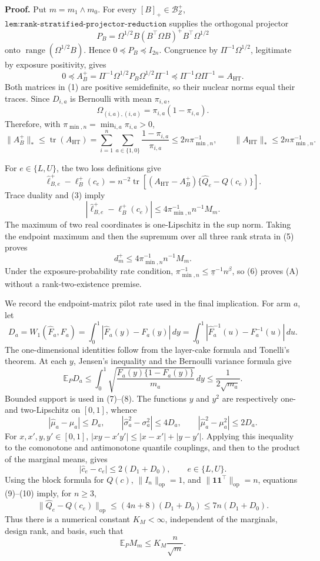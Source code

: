 \textbf{Proof.}
Put \(m=m_1\wedge m_0\).  For every \([B]_+\in\mathcal B_Z^+\), \(\texttt{lem:rank-stratified-projector-reduction}\) supplies the orthogonal projector
\[
P_B=\Omega^{1/2}B(B^{\top}\Omega B)^+B^{\top}\Omega^{1/2}
\]
onto \(\operatorname{range}(\Omega^{1/2}B)\).  Hence \(0\preceq P_B\preceq I_{2n}\).  Congruence by \(\Pi^{-1}\Omega^{1/2}\), legitimate by exposure positivity, gives
\[
0\preceq
A_B^+=\Pi^{-1}\Omega^{1/2}P_B\Omega^{1/2}\Pi^{-1}
\preceq
\Pi^{-1}\Omega\Pi^{-1}=A_{\mathrm{HT}}.
\tag{1}
\]
Both matrices in (1) are positive semidefinite, so their nuclear norms equal their traces.  Since \(D_{i,a}\) is Bernoulli with mean \(\pi_{i,a}\),
\[
\Omega_{(i,a),(i,a)}=\pi_{i,a}(1-\pi_{i,a}).
\tag{2}
\]
Therefore, with \(\pi_{\min,n}=\min_{i,a}\pi_{i,a}>0\),
\[
\lVert A_B^+\rVert_*
\le\operatorname{tr}(A_{\mathrm{HT}})
=\sum_{i=1}^n\sum_{a\in\{1,0\}}
\frac{1-\pi_{i,a}}{\pi_{i,a}}
\le2n\pi_{\min,n}^{-1},
\qquad
\lVert A_{\mathrm{HT}}\rVert_*
\le2n\pi_{\min,n}^{-1}.
\tag{3}
\]

For \(e\in\{L,U\}\), the two loss definitions give
\[
\widehat\ell_{B,e}^+-\ell_B^+(c_e)
=n^{-2}\operatorname{tr}\!\left[
(A_{\mathrm{HT}}-A_B^+)\{\widehat Q_e-Q(c_e)\}
\right].
\tag{4}
\]
Trace duality and (3) imply
\[
\left|\widehat\ell_{B,e}^+-\ell_B^+(c_e)\right|
\le4\pi_{\min,n}^{-1}n^{-1}M_m.
\tag{5}
\]
The maximum of two real coordinates is one-Lipschitz in the sup norm.  Taking the endpoint maximum and then the supremum over all three rank strata in (5) proves
\[
d_m^+\le4\pi_{\min,n}^{-1}n^{-1}M_m.
\tag{6}
\]
Under the exposure-probability rate condition,
\(
\pi_{\min,n}^{-1}\le\underline\pi^{-1}n^\beta
\), so (6) proves (A) without a rank-two-existence premise.

We record the endpoint-matrix pilot rate used in the final implication.  For arm \(a\), let
\[
D_a=W_1(\widehat F_a,F_a)
=\int_0^1|\widehat F_a(y)-F_a(y)|\,dy
=\int_0^1|\widehat F_a^{-1}(u)-F_a^{-1}(u)|\,du.
\tag{7}
\]
The one-dimensional identities follow from the layer-cake formula and Tonelli's theorem.  At each \(y\), Jensen's inequality and the Bernoulli variance formula give
\[
\mathbb E_P D_a
\le\int_0^1\sqrt{\frac{F_a(y)\{1-F_a(y)\}}{m_a}}\,dy
\le\frac{1}{2\sqrt{m_a}}.
\tag{8}
\]
Bounded support is used in (7)--(8).  The functions \(y\) and \(y^2\) are respectively one- and two-Lipschitz on \([0,1]\), whence
\[
|\widehat\mu_a-\mu_a|\le D_a,
\qquad
|\widehat\sigma_a^2-\sigma_a^2|\le4D_a,
\qquad
|\widehat\mu_a^2-\mu_a^2|\le2D_a.
\tag{9}
\]
For \(x,x',y,y'\in[0,1]\),
\(
|xy-x'y'|\le|x-x'|+|y-y'|
\).  Applying this inequality to the comonotone and antimonotone quantile couplings, and then to the product of the marginal means, gives
\[
|\widehat c_e-c_e|\le2(D_1+D_0),
\qquad e\in\{L,U\}.
\tag{10}
\]
Using the block formula for \(Q(c)\),
\(
\lVert I_n\rVert_{\mathrm{op}}=1
\), and
\(
\lVert\mathbf1\mathbf1^{\top}\rVert_{\mathrm{op}}=n
\), equations (9)--(10) imply, for \(n\ge3\),
\[
\lVert\widehat Q_e-Q(c_e)\rVert_{\mathrm{op}}
\le(4n+8)(D_1+D_0)
\le7n(D_1+D_0).
\tag{11}
\]
Thus there is a numerical constant \(K_M<\infty\), independent of the marginals, design rank, and basis, such that
\[
\mathbb E_PM_m\le K_M\frac{n}{\sqrt m}.
\tag{12}
\]


